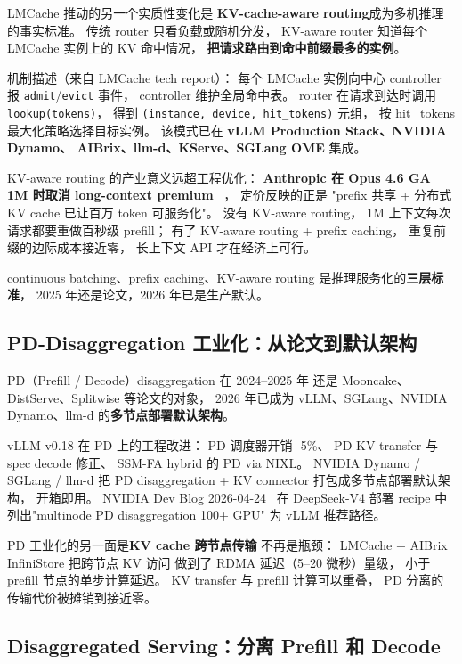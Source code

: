 LMCache 推动的另一个实质性变化是
\textbf{KV-cache-aware routing}成为多机推理的事实标准。
传统 router 只看负载或随机分发，
KV-aware router 知道每个 LMCache 实例上的 KV 命中情况，
\textbf{把请求路由到命中前缀最多的实例}。

机制描述（来自 LMCache tech report）：
每个 LMCache 实例向中心 controller
报 \texttt{admit}/\texttt{evict} 事件，
controller 维护全局命中表。
router 在请求到达时调用 \texttt{lookup(tokens)}，
得到 \texttt{(instance, device, hit\_tokens)} 元组，
按 hit\_tokens 最大化策略选择目标实例。
该模式已在 \textbf{vLLM Production Stack、NVIDIA Dynamo、
AIBrix、llm-d、KServe、SGLang OME} 集成。

KV-aware routing 的产业意义远超工程优化：
\textbf{Anthropic 在 Opus 4.6 GA 1M 时取消 long-context premium}
~\cite{anthropic2026context1m}，
定价反映的正是
"prefix 共享 + 分布式 KV cache 已让百万 token 可服务化"。
没有 KV-aware routing，
1M 上下文每次请求都要重做百秒级 prefill；
有了 KV-aware routing + prefix caching，
重复前缀的边际成本接近零，
长上下文 API 才在经济上可行。

continuous batching、prefix caching、KV-aware routing
是推理服务化的\textbf{三层标准}，
2025 年还是论文，2026 年已是生产默认。

\subsection{PD-Disaggregation 工业化：从论文到默认架构}
\label{sec:pd-disagg-industrial}

PD（Prefill / Decode）disaggregation 在 2024--2025 年
还是 Mooncake、DistServe、Splitwise 等论文的对象，
2026 年已成为 vLLM、SGLang、NVIDIA Dynamo、llm-d
的\textbf{多节点部署默认架构}。

vLLM v0.18 在 PD 上的工程改进：
PD 调度器开销 -5\%、
PD KV transfer 与 spec decode 修正、
SSM-FA hybrid 的 PD via NIXL。
NVIDIA Dynamo / SGLang / llm-d
把 PD disaggregation + KV connector
打包成多节点部署默认架构，
开箱即用。
NVIDIA Dev Blog 2026-04-24~\cite{deepseekv4nvidiarecipe2026}
在 DeepSeek-V4 部署 recipe 中
列出"multinode PD disaggregation 100+ GPU"
为 vLLM 推荐路径。

PD 工业化的另一面是\textbf{KV cache 跨节点传输}
不再是瓶颈：
LMCache + AIBrix InfiniStore 把跨节点 KV 访问
做到了 RDMA 延迟（5--20 微秒）量级，
小于 prefill 节点的单步计算延迟。
KV transfer 与 prefill 计算可以重叠，
PD 分离的传输代价被摊销到接近零。

\subsection{Disaggregated Serving：分离 Prefill 和 Decode}

